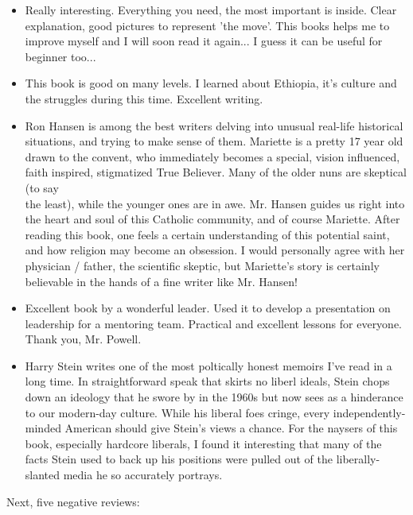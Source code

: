 \documentclass[10pt]{book}
\begin{document}
\begin{itemize}
  \item Really interesting. Everything you need, the most important is inside. Clear explanation, good pictures to represent 'the move'. This books helps me to improve myself and I will soon read it again... I guess it can be useful for beginner too...
  \item This book is good on many levels. I learned about Ethiopia, it's culture and the struggles during this time. Excellent writing.
  \item Ron Hansen is among the best writers delving into unusual real-life historical situations, and trying to make sense of them. Mariette is a pretty 17 year old drawn to the convent, who immediately becomes a special, vision influenced, faith inspired, stigmatized True Believer. Many of the older nuns are skeptical (to say\\
the least), while the younger ones are in awe. Mr. Hansen guides us right into the heart and soul of this Catholic community, and of course Mariette. After reading this book, one feels a certain understanding of this potential saint, and how religion may become an obsession. I would personally agree with her physician / father, the scientific skeptic, but Mariette's story is certainly believable in the hands of a fine writer like Mr. Hansen!
  \item Excellent book by a wonderful leader. Used it to develop a presentation on leadership for a mentoring team. Practical and excellent lessons for everyone. Thank you, Mr. Powell.
  \item Harry Stein writes one of the most poltically honest memoirs I've read in a long time. In straightforward speak that skirts no liberl ideals, Stein chops down an ideology that he swore by in the 1960s but now sees as a hinderance to our modern-day culture. While his liberal foes cringe, every independently-minded American should give Stein's views a chance. For the naysers of this book, especially hardcore liberals, I found it interesting that many of the facts Stein used to back up his positions were pulled out of the liberally-slanted media he so accurately portrays.
\end{itemize}

Next, five negative reviews:
\end{document}
